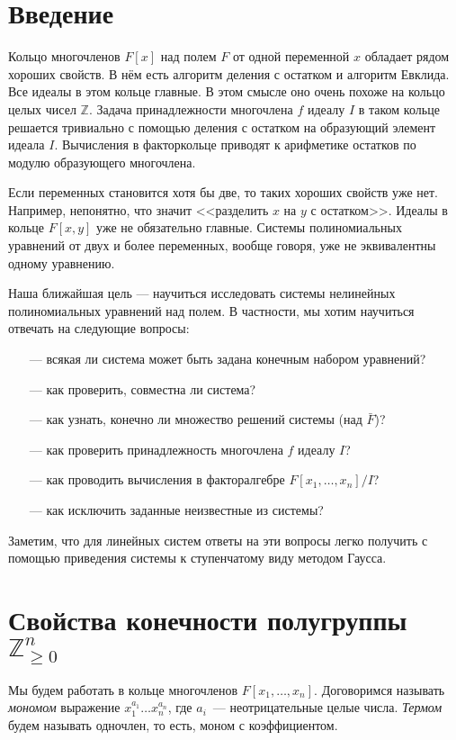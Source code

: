 \documentclass[a4paper,reqno,12pt]{amsart}
\theoremstyle{plain}
\theoremstyle{remark}
\theoremstyle{definition}
\renewcommand{\ge}{\geqslant}
\newcommand{\Z}{\mathbb{Z}}
\newcommand{\Zplusn}{\Z_{\ge 0}^n}
\begin{document}
\section*{Введение}

Кольцо многочленов $F[x]$ над полем $F$ от одной переменной $x$ обладает рядом хороших свойств.
В нём есть алгоритм деления с остатком и алгоритм Евклида. Все идеалы в этом кольце главные. В этом смысле оно очень похоже на кольцо целых чисел $\Z$.
Задача принадлежности многочлена $f$ идеалу $I$ в таком кольце решается тривиально с помощью деления с остатком на образующий элемент идеала $I$. Вычисления в факторкольце приводят к арифметике остатков по модулю образующего многочлена.

Если переменных становится хотя бы две, то таких хороших свойств уже нет. 
Например, непонятно, что значит <<разделить $x$ на $y$ с остатком>>.
Идеалы в кольце $F[x,y]$ уже не обязательно главные.
Системы полиномиальных уравнений от двух и более переменных, вообще говоря, уже не эквивалентны одному уравнению.

Наша ближайшая цель --- научиться исследовать системы нелинейных полиномиальных уравнений над полем.
В частности, мы хотим научиться отвечать на следующие вопросы:
\begin{itemize}
\item[---] всякая ли система может быть задана конечным набором уравнений?
\item[---] как проверить, совместна ли система?
\item[---] как узнать, конечно ли множество решений системы (над $\bar{F}$)?
\item[---] как проверить принадлежность многочлена $f$ идеалу $I$?
\item[---] как проводить вычисления в факторалгебре $F[x_1, \ldots, x_n]/I$?
\item[---] как исключить заданные неизвестные из системы?
\end{itemize}

Заметим, что для линейных систем ответы на эти вопросы легко получить с помощью приведения системы к ступенчатому виду методом Гаусса.


\section{Свойства конечности полугруппы $\Zplusn$}
Мы будем работать в кольце многочленов $F[x_1, \ldots, x_n]$.
Договоримся называть \emph{мономом} выражение $x_1^{a_1} \ldots x_n^{a_n}$, где $a_i$~--- неотрицательные целые числа. \emph{Термом} будем называть одночлен, то есть, моном с коэффициентом.
\end{document}

